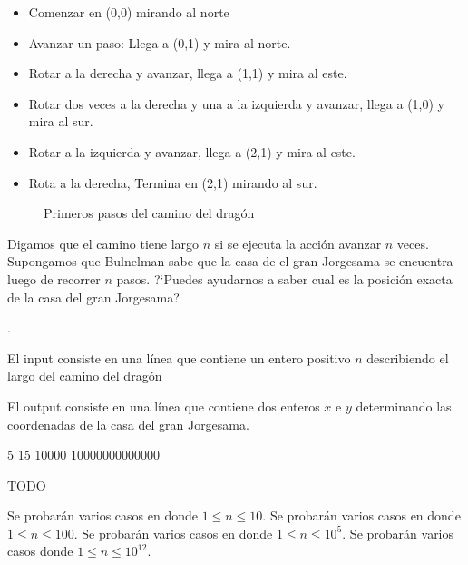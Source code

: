 \documentclass{article}
\begin{document}
\begin{problemDescription}
\begin{itemize}
	\item Comenzar en (0,0) mirando al norte
	\item Avanzar un paso: Llega a (0,1) y mira al norte.
	\item Rotar a la derecha y avanzar, llega a (1,1) y mira al este.
	\item Rotar dos veces a la derecha y una a la izquierda y avanzar, llega a (1,0) y mira al sur.
	\item Rotar a la izquierda y avanzar, llega a (2,1) y mira al este.
	\item Rota a la derecha, Termina en (2,1) mirando al sur.
\end{itemize}

\begin{figure}[h]
\begin{center}
\end{center}
	\caption{Primeros pasos del camino del drag\'on}
\end{figure}


Digamos que el camino tiene largo $n$ si se ejecuta la acci\'on avanzar $n$ veces. Supongamos que Bulnelman sabe que la casa de el gran Jorgesama se encuentra luego de recorrer $n$ pasos. ?`Puedes ayudarnos a saber cual es la posici\'on exacta de la casa del gran Jorgesama?

.\end{problemDescription}

\begin{inputDescription}
El input consiste en una l\'inea que contiene un entero positivo $n$ describiendo el largo del camino del drag\'on
\end{inputDescription}

\begin{outputDescription}
El output consiste en una l\'inea que contiene dos enteros $x$ e $y$ determinando las coordenadas de la casa del gran Jorgesama.
\end{outputDescription}

\begin{sampleInput}
5
15
10000
10000000000000
\end{sampleInput}
\begin{sampleOutput}
TODO
\end{sampleOutput}

\begin{scoreDescription}
 Se probar\'an varios casos en donde $1 \leq n \leq 10$.
 Se probar\'an varios casos en donde $1 \leq n \leq 100$.
 Se probar\'an varios casos en donde $1 \leq n \leq 10^5$.
 Se probar\'an varios casos donde $1 \leq n \leq 10^{12}$. 
\end{scoreDescription}
\end{document}
